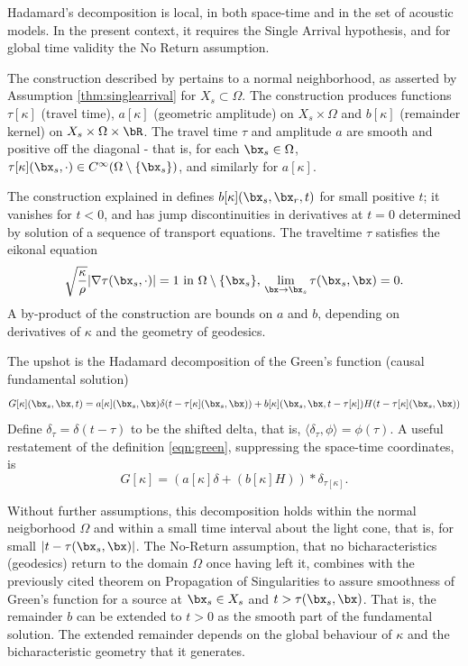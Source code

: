 Hadamard's decomposition is local, in both space-time and in the set of
acoustic models. In the present context, it requires the Single
Arrival hypothesis, and for global time validity the No Return
assumption. 

The construction described by \cite{Friedlander:75} pertains to a
normal neighborhood, as asserted by Assumption \ref{thm:singlearrival}
for $X_{s} \subset \Omega$. The construction produces
functions $\tau[\kappa]$ (travel time), $a[\kappa]$
(geometric amplitude) on $X_s \times \Omega$ and $b[\kappa]$
(remainder kernel) on $X_s \times \Omega \times \bR$. The travel time $\tau$
and amplitude
$a$ are smooth and positive off the
diagonal - that is, for each $\bx_s \in \Omega$, $\tau[\kappa](\bx_s,\cdot) \in C^{\infty}(\Omega \setminus
\{\bx_s\})$, and similarly for $a[\kappa]$.

The construction explained in \cite{Friedlander:75} defines
$b[\kappa](\bx_s, \bx_r,t)$ for small positive $t$; it vanishes for
$t<0$, and has jump discontinuities in derivatives at $t=0$ determined
by solution of a sequence of transport equations. The traveltime
$\tau$ satisfies the eikonal equation
\[
  \sqrt{\frac{\kappa}{\rho}} |\nabla \tau(\bx_s,\cdot)| = 1 \mbox{ in
  } \Omega \setminus \{\bx_s\}, \, \lim_{\bx \rightarrow \bx_s}
  \tau(\bx_s,\bx) = 0.
\] 
A by-product of the construction are bounds on $a$ and $b$, depending on
derivatives of $\kappa$ and the geometry of geodesics.

The upshot is the Hadamard decomposition of the Green's function
(causal fundamental solution)
\begin{equation}
  \label{eqn:green}
  G[\kappa](\bx_s,\bx,t) = a[\kappa](\bx_s,\bx)\delta(t - \tau[\kappa](\bx_s,\bx)) +
  b[\kappa](\bx_s,\bx,t-\tau[\kappa])H(t - \tau[\kappa](\bx_s,\bx))
\end{equation}
Define $\delta_{\tau} = \delta(t-\tau)$ to be the shifted delta, that
is, $\langle \delta_{\tau},\phi\rangle = \phi(\tau)$. A useful
restatement of the definition \ref{eqn:green}, suppressing the
space-time coordinates, is
\begin{equation}
  \label{eqn:regreen}
  G[\kappa] = (a[\kappa]\delta +  (b[\kappa]H))*\delta_{\tau[\kappa]}.
\end{equation}

Without further assumptions, this decomposition holds within the
normal neigborhood $\Omega$ and within a small time interval about the
light cone, that is, for small $|t-\tau(\bx_s,\bx)|$. The No-Return
assumption, that no bicharacteristics (geodesics) return to the domain
$\Omega$ once having left it, combines with the previously cited
theorem on Propagation of Singularities to assure smoothness of
Green's function for a source at $\bx_s \in X_s$ and
$t>\tau(\bx_s,\bx)$. That is, the remainder $b$ can be extended to
$t > 0$ as the smooth part of the fundamental solution. The extended
remainder depends on the global behaviour of $\kappa$ and the
bicharacteristic geometry that it generates.

